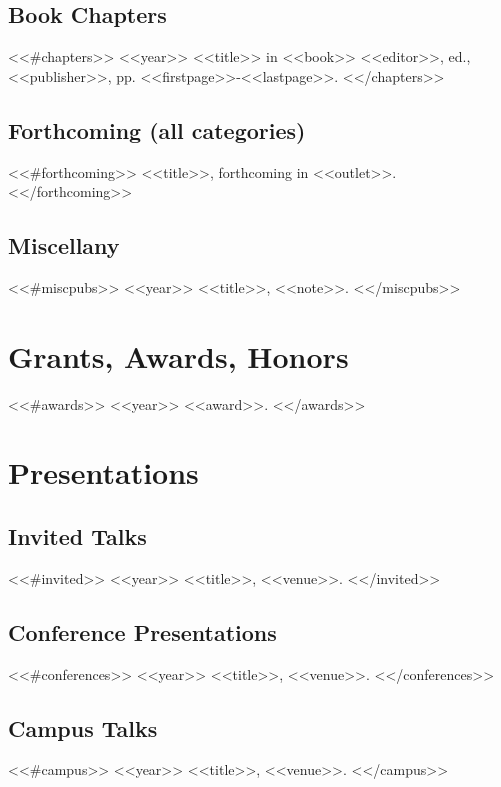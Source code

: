 \documentclass[letterpaper]{moderncv}
\begin{document}
\subsection{Book Chapters}
<<#chapters>>
\cventry
{<<year>>}
{<<title>>}
{}
{in <<book>>}
{}
{<<editor>>, ed., <<publisher>>, pp. <<firstpage>>-<<lastpage>>.}
\vspace{1mm}
<</chapters>>
\vspace{1mm}

\subsection{Forthcoming (all categories)}
<<#forthcoming>>
\cvitem
{}
{<<title>>, forthcoming in <<outlet>>.}
\vspace{1mm}
<</forthcoming>>

\subsection{Miscellany}
<<#miscpubs>>
\cvitem
{<<year>>}
{<<title>>, <<note>>.}
\vspace{1mm}
<</miscpubs>>


\section{Grants, Awards, Honors}
<<#awards>>
\cvitem
{<<year>>}
{<<award>>.}
\vspace{1mm}
<</awards>>


\section{Presentations}
\subsection{Invited Talks}
<<#invited>>
\cvitem
{<<year>>}
{<<title>>, <<venue>>.}
\vspace{1mm}
<</invited>>
\subsection{Conference Presentations}
<<#conferences>>
\cvitem
{<<year>>}
{<<title>>, <<venue>>.}
\vspace{1mm}
<</conferences>>
\subsection{Campus Talks}
<<#campus>>
\cvitem
{<<year>>}
{<<title>>, <<venue>>.}
\vspace{1mm}
<</campus>>
\end{document}
